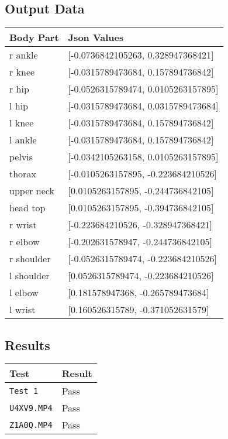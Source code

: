 \documentclass{scrreprt}
\begin{document}
\subsection{Output Data}
\begin{table}[H]
    \centering
    \begin{tabular}{||p{2cm}|p{6.5cm}||}
        \hline
        \textbf{Body Part} & \textbf {Json Values}\\
         \hline\hline
        r ankle & [-0.0736842105263, 0.328947368421] \\
        \hline
        r knee & [-0.0315789473684, 0.157894736842] \\
        \hline
        r hip & [-0.0526315789474, 0.0105263157895] \\
        \hline
        l hip & [-0.0315789473684, 0.0315789473684] \\
        \hline
        l knee & [-0.0315789473684, 0.157894736842] \\
        \hline
        l ankle & [-0.0315789473684, 0.157894736842] \\
        \hline
        pelvis & [-0.0342105263158, 0.0105263157895]\\
        \hline
        thorax & [-0.0105263157895, -0.223684210526] \\
        \hline
        upper neck & [0.0105263157895, -0.244736842105] \\
        \hline
        head top & [0.0105263157895, -0.394736842105] \\
        \hline
        r wrist & [-0.223684210526, -0.328947368421] \\
        \hline
        r elbow & [-0.202631578947, -0.244736842105] \\
        \hline
        r shoulder & [-0.0526315789474, -0.223684210526] \\
        \hline
        l shoulder & [0.0526315789474, -0.223684210526] \\
        \hline
        l elbow & [0.181578947368, -0.265789473684] \\
        \hline
        l wrist & [0.160526315789, -0.371052631579] \\
        \hline
    \end{tabular}
\end{table}

\subsection{Results}
\begin{table}[H]
        \centering
        \begin{tabular}{||p{2.5cm}|p{2.5cm}||}
                \hline
                \textbf Test & \textbf Result\\
                \hline\hline
                \verb|Test 1|  &  Pass\\
                \hline
                \verb|U4XV9.MP4|  &  Pass\\
                \hline
                \verb|Z1A0Q.MP4| & Pass\\
                \hline
        \end{tabular}
\end{table}
\end{document}
